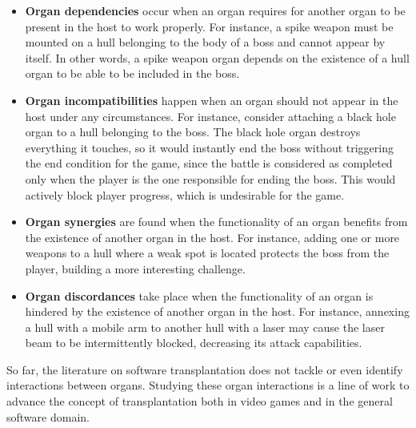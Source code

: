 \begin{itemize}
    
    \item \textbf{Organ dependencies} occur when an organ requires for another organ to be present in the host to work properly. For instance, a spike weapon must be mounted on a hull belonging to the body of a boss and cannot appear by itself. In other words, a spike weapon organ depends on the existence of a hull organ to be able to be included in the boss.
    
    \item \textbf{Organ incompatibilities} happen when an organ should not appear in the host under any circumstances. For instance, consider attaching a black hole organ to a hull belonging to the boss. The black hole organ destroys everything it touches, so it would instantly end the boss without triggering the end condition for the game, since the battle is considered as completed only when the player is the one responsible for ending the boss. This would actively block player progress, which is undesirable for the game.
    
    \item \textbf{Organ synergies} are found when the functionality of an organ benefits from the existence of another organ in the host. For instance, adding one or more weapons to a hull where a weak spot is located protects the boss from the player, building a more interesting challenge.
    
    \item \textbf{Organ discordances} take place when the functionality of an organ is hindered by the existence of another organ in the host. For instance, annexing a hull with a mobile arm to another hull with a laser may cause the laser beam to be intermittently blocked, decreasing its attack capabilities.
    
\end{itemize}

So far, the literature on software transplantation does not tackle or even identify interactions between organs. Studying these organ interactions is a line of work to advance the concept of  transplantation both in video games and in the general software domain.

